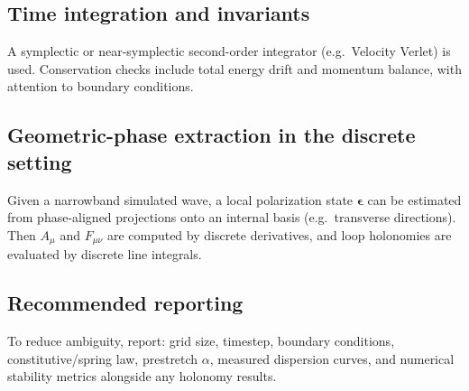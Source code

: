 \subsection{Time integration and invariants}

A symplectic or near-symplectic second-order integrator (e.g.\ Velocity Verlet) is used.
Conservation checks include total energy drift and momentum balance, with attention to boundary conditions.

\subsection{Geometric-phase extraction in the discrete setting}

Given a narrowband simulated wave, a local polarization state $\bm{\epsilon}$ can be estimated from
phase-aligned projections onto an internal basis (e.g.\ transverse directions).
Then $A_\mu$ and $F_{\mu\nu}$ are computed by discrete derivatives, and loop holonomies are evaluated by discrete line integrals.

\subsection{Recommended reporting}

To reduce ambiguity, report:
grid size, timestep, boundary conditions, constitutive/spring law, prestretch $\alpha$,
measured dispersion curves, and numerical stability metrics alongside any holonomy results.
